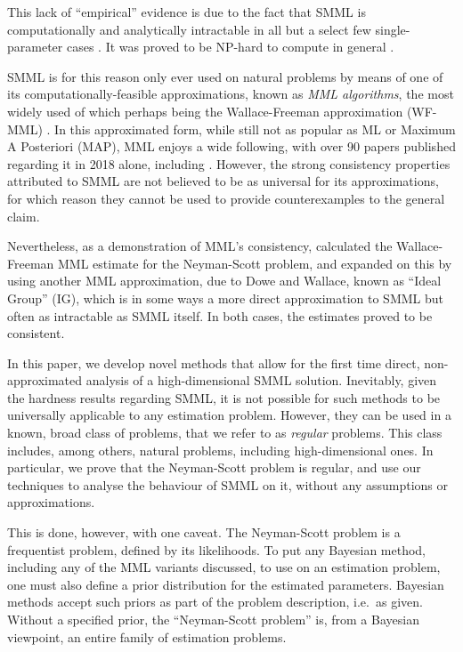 \documentclass{IEEEtran}
\newcommand{\citet}[1]{\cite{#1}}
\newcommand{\citep}[1]{\cite{#1}}
\begin{document}
This lack of ``empirical'' evidence is due to the fact that SMML is
computationally and analytically intractable in all but a select
few single-parameter cases \citep{dowty2015smml}.
It was proved to be NP-hard to compute in general
\citep{farrwallace2002}.

SMML is for this reason only ever used on natural problems by means of one
of its computationally-feasible approximations, known as \emph{MML algorithms}, 
the most widely used of which perhaps being the Wallace-Freeman approximation
(WF-MML) \citet{WallaceFreeman1987}. In this approximated form, while still
not as popular as ML or Maximum A Posteriori (MAP), MML enjoys a wide following,
with over 90 papers published regarding it in 2018 alone, including
\citet{cheeseman2018bayesian,zamzami2018mml,li2018subspace,channoufi2018color}.
However, the strong consistency properties attributed to SMML are not
believed to be as universal for its approximations, for which reason they
cannot be used to provide counterexamples to the general claim.

Nevertheless, as a demonstration of MML's consistency,
\citet{dowe1997resolving} calculated the Wallace-Freeman MML estimate
for the Neyman-Scott problem, and \cite[Sections 4.2--4.9]{Wallace2005}
expanded on this by using another MML approximation, due to Dowe and Wallace,
known as
``Ideal Group'' (IG), which is in some ways a more direct approximation to
SMML but often as intractable as SMML itself.
In both cases, the estimates proved to be consistent.

In this paper, we develop novel methods that allow for the first time direct,
non-approximated analysis of a high-dimensional SMML solution.
Inevitably, given the hardness results regarding SMML, it is not possible
for such methods to be universally applicable to any estimation problem.
However, they can be used in a known, broad class of problems, that we
refer to as \emph{regular} problems. This class includes, among others,
natural problems, including
high-dimensional ones. In particular, we prove that the Neyman-Scott
problem is regular, and use our techniques to analyse the behaviour
of SMML on it, without any assumptions or approximations.

This is done, however, with one caveat.
The Neyman-Scott problem is a frequentist problem, defined by its
likelihoods. To put any Bayesian method, including any of the MML variants
discussed, to use on an estimation problem, one must also define a prior
distribution for the estimated parameters. Bayesian methods accept such
priors as part of the problem description, i.e.\ as given.
Without a specified prior, the
``Neyman-Scott problem'' is, from a Bayesian viewpoint, an entire family of
estimation problems.
\end{document}
